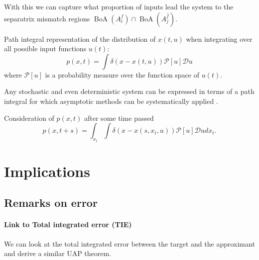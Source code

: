 \documentclass{article}
\theoremstyle{definition} \newtheorem{definition}{Definition}
\theoremstyle{remark} \newtheorem{remark}{Remark}
\newcommand{\boa}{\operatorname{BoA}}
\newcounter{ct}
\begin{document}
With this we can capture what proportion of inputs lead the system to the separatrix mismatch regions $\boa(A_i^f)\cap\boa(A_j^{\hat{f}})$. %



Path integral representation of the distribution of $x(t,u)$ when integrating over all possible input functions $u(t)$:
\begin{equation}
    p(x,t) = \int \delta(x - x(t, u)) \mathcal{P}[u] \mathcal{D}u
\end{equation}
where $\mathcal{P}[u]$ is a probability measure over the function space of $u(t)$.

Any stochastic and even deterministic system can be expressed in terms of a path integral for which asymptotic methods can be systematically applied \citep{chow2015path}.


Consideration of $p(x,t)$ after some time passed %
\begin{equation}
    p(x,t+s) = \int_{x_t} \int \delta(x - x(s, x_t, u)) \mathcal{P}[u] \mathcal{D}u dx_t.
\end{equation}









\newpage
\section{Implications}

\subsection{Remarks on error}\label{sec:error_remarks}
\paragraph{Link to Total integrated error (TIE)}
We can look at the total integrated error between the target and the approximant and derive a similar UAP theorem.
\end{document}
